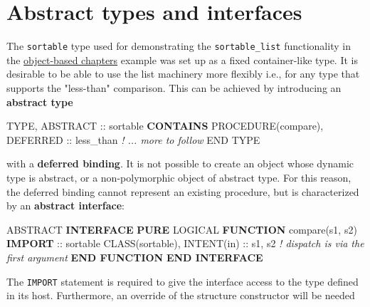 \documentclass[
]{scrartcl}
\newenvironment{Shaded}{}{}
\newcommand{\CommentTok}[1]{\textcolor[rgb]{0.38,0.63,0.69}{\textit{#1}}}
\newcommand{\DataTypeTok}[1]{\textcolor[rgb]{0.56,0.13,0.00}{#1}}
\newcommand{\KeywordTok}[1]{\textcolor[rgb]{0.00,0.44,0.13}{\textbf{#1}}}
\newcommand{\NormalTok}[1]{#1}
\begin{document}
\section{Abstract types and
interfaces}\label{abstract-types-and-interfaces}

The \texttt{sortable} type used for demonstrating the
\texttt{sortable\_list} functionality in the
\href{https://en.wikipedia.org/wiki/User:RBaSc/draft_ftnoo\#Object-based_features_and_programming_techniques}{object-based
chapter\textquotesingle s} example was set up as a fixed container-like
type. It is desirable to be able to use the list machinery more flexibly
i.e., for any type that supports the "less-than" comparison. This can be
achieved by introducing an \textbf{abstract type}

\begin{Shaded}
\begin{Highlighting}[]
\DataTypeTok{TYPE}\NormalTok{, }\DataTypeTok{ABSTRACT} \DataTypeTok{::}\NormalTok{ sortable}
\KeywordTok{CONTAINS}
   \DataTypeTok{PROCEDURE(compare)}\NormalTok{, }\DataTypeTok{DEFERRED} \DataTypeTok{::}\NormalTok{ less\_than}
   \CommentTok{! ... more to follow}
\DataTypeTok{END TYPE}
\end{Highlighting}
\end{Shaded}

with a \textbf{deferred binding}. It is not possible to create an object
whose dynamic type is abstract, or a non-polymorphic object of abstract
type. For this reason, the deferred binding cannot represent an existing
procedure, but is characterized by an \textbf{abstract interface}:

\begin{Shaded}
\begin{Highlighting}[]
\DataTypeTok{ABSTRACT} \KeywordTok{INTERFACE}
   \KeywordTok{PURE} \DataTypeTok{LOGICAL} \KeywordTok{FUNCTION}\NormalTok{ compare(s1, s2)}
      \KeywordTok{IMPORT} \DataTypeTok{::}\NormalTok{ sortable}
      \DataTypeTok{CLASS(sortable)}\NormalTok{, }\DataTypeTok{INTENT(in)} \DataTypeTok{::}\NormalTok{ s1, s2}
      \CommentTok{! dispatch is via the first argument}
   \KeywordTok{END FUNCTION}
\KeywordTok{END INTERFACE}
\end{Highlighting}
\end{Shaded}

The \texttt{IMPORT} statement is required to give the interface access
to the type defined in its host. Furthermore, an override of the
structure constructor will be needed
\end{document}
